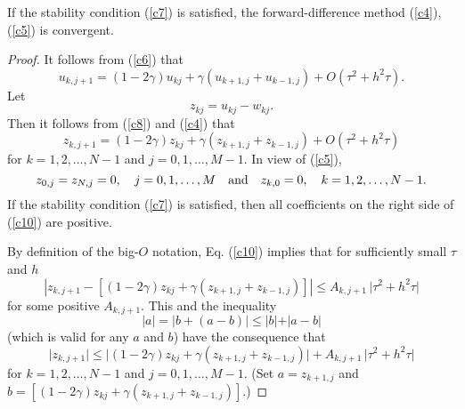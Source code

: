 \begin{theorem}
If the stability condition (\ref{c7}) is satisfied,  the forward-difference method 
(\ref{c4}), (\ref{c5}) is convergent.
\end{theorem}

\begin{proof}
It follows from (\ref{c6}) that
\begin{equation}
u_{k,j+1}=(1-2\gamma)u_{kj}+\gamma
\left(u_{k+1,j}+u_{k-1,j}\right)+O(\tau^2+h^{2}\tau).  \label{c8}
\end{equation}
Let
\begin{equation}
z_{kj}=u_{kj}-w_{kj}. \label{c9}
\end{equation}
Then it follows from (\ref{c8}) and (\ref{c4}) that
\begin{equation}
z_{k,j+1}=(1-2\gamma)z_{kj}+\gamma
\left(z_{k+1,j}+z_{k-1,j}\right)+O(\tau^2+h^{2}\tau)  \label{c10}
\end{equation}
for $k=1,2,\dots,N-1$ and $j=0,1,\dots,M-1$.
In view of (\ref{c5}),
\begin{equation}
z_{0,j}=z_{N,j}=0,  \quad j=0,1,\dots,M \quad {\rm and} \quad
z_{k,0}=0, \quad k=1,2,\dots,N-1. \label{c11}
\end{equation}
If the stability condition (\ref{c7}) is satisfied, then
all coefficients on the right side of (\ref{c10}) are positive.

By definition of the big-$O$ notation, Eq. (\ref{c10}) implies that for
sufficiently small $\tau$ and $h$
\[
\left\vert z_{k,j+1}-\left[(1-2\gamma)z_{kj}+\gamma
\left(z_{k+1,j}+z_{k-1,j}\right)\right]\right\vert \leq A_{k,j+1} \, \vert\tau^2+h^{2}\tau\vert
\]
for some positive $A_{k,j+1}$. This and the inequality
\[
\vert a\vert = \vert b +(a-b)\vert\leq \vert b\vert + \vert a-b\vert
\]
(which is valid for any $a$ and $b$)
have the consequence that
\begin{equation}
\vert z_{k,j+1}\vert \leq\vert (1-2\gamma)z_{kj}+\gamma
\left(z_{k+1,j}+z_{k-1,j}\right)\vert +A_{k,j+1} \, \vert\tau^2+h^{2}\tau\vert  \label{c10a}
\end{equation}
for  $k=1,2,\dots,N-1$ and $j=0,1,\dots,M-1$. 
(Set $a=z_{k+1,j}$ and $b=\left[(1-2\gamma)z_{kj}+\gamma
\left(z_{k+1,j}+z_{k-1,j}\right)\right]$.)


\end{proof}
